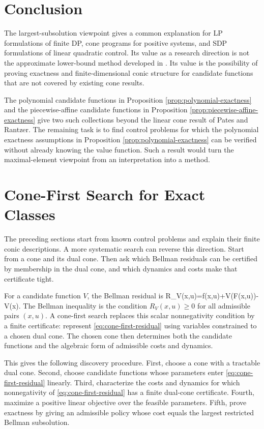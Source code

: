 \documentclass{article}
\begin{document}
\section{Conclusion}

The largest-subsolution viewpoint gives a common explanation for LP formulations of finite DP, cone programs for positive systems, and SDP formulations of linear quadratic control. Its value as a research direction is not the approximate lower-bound method developed in \cite{wang-odonoghue-boyd-2015}. Its value is the possibility of proving exactness and finite-dimensional conic structure for candidate functions that are not covered by existing cone results.

The polynomial candidate functions in Proposition \ref{prop:polynomial-exactness} and the piecewise-affine candidate functions in Proposition \ref{prop:piecewise-affine-exactness} give two such collections beyond the linear cone result of Pates and Rantzer. The remaining task is to find control problems for which the polynomial exactness assumptions in Proposition \ref{prop:polynomial-exactness} can be verified without already knowing the value function. Such a result would turn the maximal-element viewpoint from an interpretation into a method.


\appendix

\section{Cone-First Search for Exact Classes}

The preceding sections start from known control problems and explain their finite conic descriptions. A more systematic search can reverse this direction. Start from a cone and its dual cone. Then ask which Bellman residuals can be certified by membership in the dual cone, and which dynamics and costs make that certificate tight.

For a candidate function $V$, the Bellman residual is
\BEQ
R_V(x,u)=f(x,u)+\gamma V(F(x,u))-V(x).
\label{eq:cone-first-residual}
\EEQ
The Bellman inequality is the condition $R_V(x,u)\geq0$ for all admissible pairs $(x,u)$. A cone-first search replaces this scalar nonnegativity condition by a finite certificate: represent \eqref{eq:cone-first-residual} using variables constrained to a chosen dual cone. The chosen cone then determines both the candidate functions and the algebraic form of admissible costs and dynamics.

This gives the following discovery procedure. First, choose a cone with a tractable dual cone. Second, choose candidate functions whose parameters enter \eqref{eq:cone-first-residual} linearly. Third, characterize the costs and dynamics for which nonnegativity of \eqref{eq:cone-first-residual} has a finite dual-cone certificate. Fourth, maximize a positive linear objective over the feasible parameters. Fifth, prove exactness by giving an admissible policy whose cost equals the largest restricted Bellman subsolution.
\end{document}
